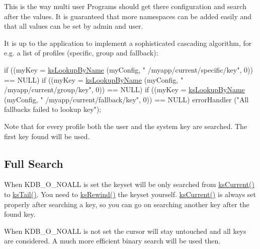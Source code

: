 This is the way multi user Programs should get there configuration and search after the values. It is guaranteed that more namespaces can be added easily and that all values can be set by admin and user.

It is up to the application to implement a sophisticated cascading algorithm, for e.\-g. a list of profiles (specific, group and fallback)\-: 
\begin{DoxyCode}
\textcolor{keywordflow}{if} ((myKey = \hyperlink{group__keyset_gad2e30fb6d4739d917c5abb2ac2f9c1a1}{ksLookupByName} (myConfig, \textcolor{stringliteral}{"
      /myapp/current/specific/key"}, 0)) == NULL)
        \textcolor{keywordflow}{if} ((myKey = \hyperlink{group__keyset_gad2e30fb6d4739d917c5abb2ac2f9c1a1}{ksLookupByName} (myConfig, \textcolor{stringliteral}{"
      /myapp/current/group/key"}, 0)) == NULL)
                \textcolor{keywordflow}{if} ((myKey = \hyperlink{group__keyset_gad2e30fb6d4739d917c5abb2ac2f9c1a1}{ksLookupByName} (myConfig, \textcolor{stringliteral}{"
      /myapp/current/fallback/key"}, 0)) == NULL)
                        errorHandler (\textcolor{stringliteral}{"All fallbacks failed to lookup key"});
\end{DoxyCode}


Note that for every profile both the user and the system key are searched. The first key found will be used.\hypertarget{group__keyset_fullsearch}{}\subsection{Full Search}\label{group__keyset_fullsearch}
When K\-D\-B\-\_\-\-O\-\_\-\-N\-O\-A\-L\-L is set the keyset will be only searched from \hyperlink{group__keyset_ga4287b9416912c5f2ab9c195cb74fb094}{ks\-Current()} to \hyperlink{group__keyset_gadca442c4ab43cf532b15091d7711559e}{ks\-Tail()}. You need to \hyperlink{group__keyset_gabe793ff51f1728e3429c84a8a9086b70}{ks\-Rewind()} the keyset yourself. \hyperlink{group__keyset_ga4287b9416912c5f2ab9c195cb74fb094}{ks\-Current()} is always set properly after searching a key, so you can go on searching another key after the found key.

When K\-D\-B\-\_\-\-O\-\_\-\-N\-O\-A\-L\-L is not set the cursor will stay untouched and all keys are considered. A much more efficient binary search will be used then.


